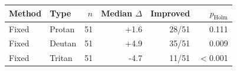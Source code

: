 \begin{tabular}{@{}llrrrr@{}}
\toprule
Method & Type & $n$ & Median $\Delta$ & Improved & $p_\mathrm{Holm}$ \\
\midrule
Fixed & Protan & 51 & +1.6 & 28/51 & 0.111 \\
Fixed & Deutan & 51 & +4.9 & 35/51 & 0.009 \\
Fixed & Tritan & 51 & -4.7 & 11/51 & \ensuremath{<}0.001 \\
\bottomrule
\end{tabular}
